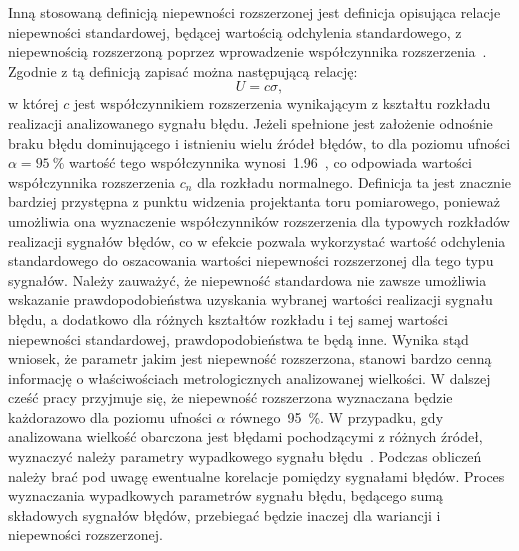 Inną stosowaną definicją niepewności rozszerzonej jest definicja opisująca relacje niepewności standardowej, będącej wartością odchylenia standardowego, z niepewnością rozszerzoną poprzez wprowadzenie współczynnika rozszerzenia~\cite{jcgm_guide}. Zgodnie z tą definicją zapisać można następującą relację:
\begin{equation}
U = c \sigma \label{eq:unc_sum},
\end{equation}
w której $c$ jest współczynnikiem rozszerzenia wynikającym z kształtu rozkładu realizacji analizowanego sygnału błędu. Jeżeli spełnione jest założenie odnośnie braku błędu dominującego i istnieniu wielu źródeł błędów, to dla poziomu ufności $\alpha = \qty{95}{\percent}$ wartość tego współczynnika wynosi~\num{1.96}~\cite{jcgm_guide}, co odpowiada wartości współczynnika rozszerzenia $c_{n}$ dla rozkładu normalnego. Definicja ta jest znacznie bardziej przystępna z punktu widzenia projektanta toru pomiarowego, ponieważ umożliwia ona wyznaczenie współczynników rozszerzenia dla typowych rozkładów realizacji sygnałów błędów, co w efekcie pozwala wykorzystać wartość odchylenia standardowego do oszacowania wartości niepewności rozszerzonej dla tego typu sygnałów. Należy zauważyć, że niepewność standardowa nie zawsze umożliwia wskazanie prawdopodobieństwa uzyskania wybranej wartości realizacji sygnału błędu, a dodatkowo dla różnych kształtów rozkładu i tej samej wartości niepewności standardowej, prawdopodobieństwa te będą inne. Wynika stąd wniosek, że parametr jakim jest niepewność rozszerzona, stanowi bardzo cenną informację o właściwościach metrologicznych analizowanej wielkości. W dalszej cześć pracy przyjmuje się, że niepewność rozszerzona wyznaczana będzie każdorazowo dla poziomu ufności $\alpha$ równego~\qty{95}{\percent}. W przypadku, gdy analizowana wielkość obarczona jest błędami pochodzącymi z różnych źródeł, wyznaczyć należy parametry wypadkowego sygnału błędu~\cite{wymyslo_range}. Podczas obliczeń należy brać pod uwagę ewentualne korelacje pomiędzy sygnałami błędów. Proces wyznaczania wypadkowych parametrów sygnału błędu, będącego sumą składowych sygnałów błędów, przebiegać będzie inaczej dla wariancji i niepewności rozszerzonej.

